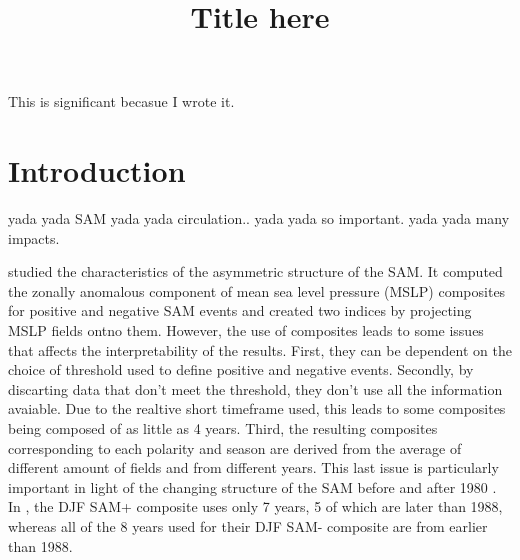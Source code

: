 \documentclass[twocol]{ametsocV5}
\title{Title here}
\affiliation{CIMA UBA blablabla}
\begin{document}
\maketitle


%
%
\statement
This is significant becasue I wrote it.



%

\section{Introduction}

yada yada SAM yada yada circulation.. yada yada so important. yada yada
many impacts.

\citet{fogt2012} studied the characteristics of the asymmetric structure
of the SAM. It computed the zonally anomalous component of mean sea
level pressure (MSLP) composites for positive and negative SAM events
and created two indices by projecting MSLP fields ontno them. However,
the use of composites leads to some issues that affects the
interpretability of the results. First, they can be dependent on the
choice of threshold used to define positive and negative events.
Secondly, by discarting data that don't meet the threshold, they don't
use all the information avaiable. Due to the realtive short timeframe
used, this leads to some composites being composed of as little as 4
years. Third, the resulting composites corresponding to each polarity
and season are derived from the average of different amount of fields
and from different years. This last issue is particularly important in
light of the changing structure of the SAM before and after 1980
\citep{silvestri2009}. In \citet{fogt2012}, the DJF SAM+ composite uses
only 7 years, 5 of which are later than 1988, whereas all of the 8 years
used for their DJF SAM- composite are from earlier than 1988.
\end{document}
